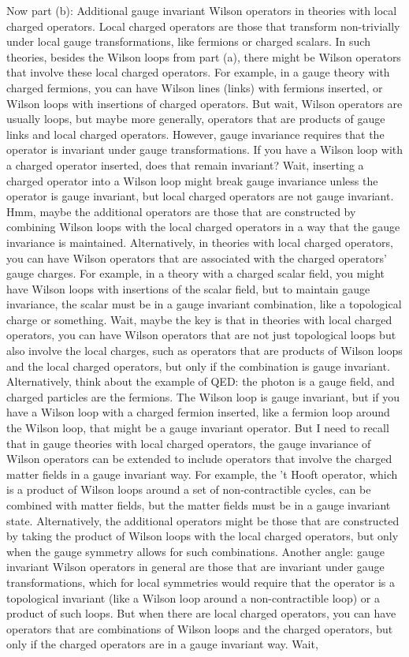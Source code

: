Now part (b): Additional gauge invariant Wilson operators in theories with local charged operators. Local charged operators are those that transform non-trivially under local gauge transformations, like fermions or charged scalars. In such theories, besides the Wilson loops from part (a), there might be Wilson operators that involve these local charged operators. For example, in a gauge theory with charged fermions, you can have Wilson lines (links) with fermions inserted, or Wilson loops with insertions of charged operators. But wait, Wilson operators are usually loops, but maybe more generally, operators that are products of gauge links and local charged operators. However, gauge invariance requires that the operator is invariant under gauge transformations. If you have a Wilson loop with a charged operator inserted, does that remain invariant? Wait, inserting a charged operator into a Wilson loop might break gauge invariance unless the operator is gauge invariant, but local charged operators are not gauge invariant. Hmm, maybe the additional operators are those that are constructed by combining Wilson loops with the local charged operators in a way that the gauge invariance is maintained. Alternatively, in theories with local charged operators, you can have Wilson operators that are associated with the charged operators' gauge charges. For example, in a theory with a charged scalar field, you might have Wilson loops with insertions of the scalar field, but to maintain gauge invariance, the scalar must be in a gauge invariant combination, like a topological charge or something. Wait, maybe the key is that in theories with local charged operators, you can have Wilson operators that are not just topological loops but also involve the local charges, such as operators that are products of Wilson loops and the local charged operators, but only if the combination is gauge invariant. Alternatively, think about the example of QED: the photon is a gauge field, and charged particles are the fermions. The Wilson loop is gauge invariant, but if you have a Wilson loop with a charged fermion inserted, like a fermion loop around the Wilson loop, that might be a gauge invariant operator. But I need to recall that in gauge theories with local charged operators, the gauge invariance of Wilson operators can be extended to include operators that involve the charged matter fields in a gauge invariant way. For example, the 't Hooft operator, which is a product of Wilson loops around a set of non-contractible cycles, can be combined with matter fields, but the matter fields must be in a gauge invariant state. Alternatively, the additional operators might be those that are constructed by taking the product of Wilson loops with the local charged operators, but only when the gauge symmetry allows for such combinations. Another angle: gauge invariant Wilson operators in general are those that are invariant under gauge transformations, which for local symmetries would require that the operator is a topological invariant (like a Wilson loop around a non-contractible loop) or a product of such loops. But when there are local charged operators, you can have operators that are combinations of Wilson loops and the charged operators, but only if the charged operators are in a gauge invariant way. Wait, 